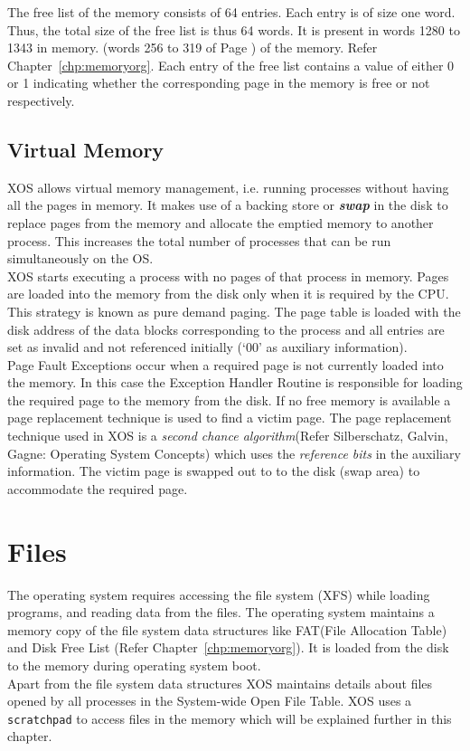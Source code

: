\documentclass[10pt]{report}
\begin{document}
The free list of the memory consists of 64 entries. Each entry is of size one word. Thus, the total size of the free list is thus 64 words. It is present in words 1280 to 1343 in memory. (words 256 to 319 of Page ) of the memory. Refer Chapter~\ref{chp:memoryorg}. Each entry of the free list contains a value of either 0 or 1 indicating whether the corresponding page in the memory is free or not respectively.

 
\section{Virtual Memory}
\label{sec:virtualmem}

XOS allows virtual memory management, i.e. running processes without having all the pages in memory. It makes use of a backing store or \textbf{\textit{swap}} in the disk to replace pages from the memory and allocate the emptied memory to another process. This increases the total number of processes that can be run simultaneously on the OS.\\

XOS starts executing a process with no pages of that process in memory. Pages are loaded into the memory from the disk only when it is required by the CPU. This strategy is known as pure demand paging. The page table is loaded with the disk address of the data blocks corresponding to the process and all entries are set as invalid and not referenced initially (`00' as auxiliary information).\\

Page Fault Exceptions occur when a required page is not currently loaded into the memory. In this case the Exception Handler Routine is responsible for loading the required page to the memory from the disk. If no free memory is available a page replacement technique is used to find a victim page. The page replacement technique used in XOS is a \textit{second chance algorithm}(Refer Silberschatz, Galvin, Gagne: Operating System Concepts) which uses the \textit{reference bits} in the auxiliary information. The victim page is swapped out to to the disk (swap area) to accommodate the required page.



 \chapter{Files}
\label{chp:files}

The operating system requires accessing the file system (XFS) while loading programs, and reading data from the files. The operating system maintains a memory copy of the file system data structures like FAT(File Allocation Table) and Disk Free List (Refer Chapter~\ref{chp:memoryorg}). It is loaded from the disk to the memory during operating system boot. \\
 Apart from the file system data structures XOS maintains details about files opened by all processes in the System-wide Open File Table. XOS uses a \texttt{scratchpad} to access files in the memory which will be explained further in this chapter.
 
\end{document}
